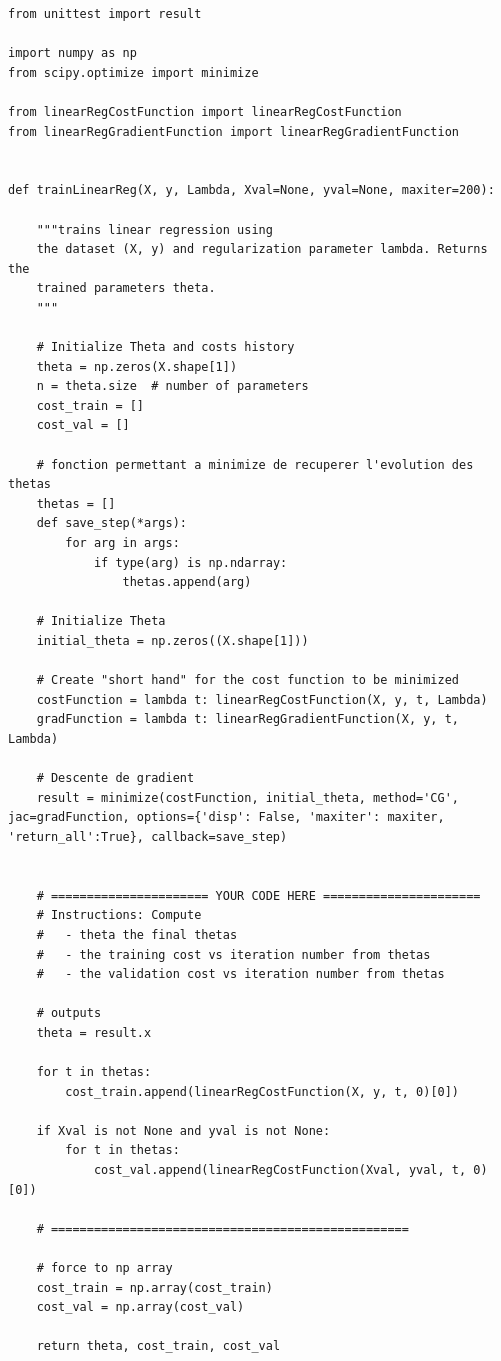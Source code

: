 \begin{lstlisting}
from unittest import result

import numpy as np
from scipy.optimize import minimize

from linearRegCostFunction import linearRegCostFunction
from linearRegGradientFunction import linearRegGradientFunction


def trainLinearReg(X, y, Lambda, Xval=None, yval=None, maxiter=200):

    """trains linear regression using
    the dataset (X, y) and regularization parameter lambda. Returns the
    trained parameters theta.
    """

    # Initialize Theta and costs history
    theta = np.zeros(X.shape[1])
    n = theta.size  # number of parameters
    cost_train = []
    cost_val = []

    # fonction permettant a minimize de recuperer l'evolution des thetas
    thetas = []
    def save_step(*args):
        for arg in args:
            if type(arg) is np.ndarray:
                thetas.append(arg)

    # Initialize Theta
    initial_theta = np.zeros((X.shape[1]))

    # Create "short hand" for the cost function to be minimized
    costFunction = lambda t: linearRegCostFunction(X, y, t, Lambda)
    gradFunction = lambda t: linearRegGradientFunction(X, y, t, Lambda)

    # Descente de gradient
    result = minimize(costFunction, initial_theta, method='CG', jac=gradFunction, options={'disp': False, 'maxiter': maxiter, 'return_all':True}, callback=save_step)


    # ====================== YOUR CODE HERE ======================
    # Instructions: Compute
    #   - theta the final thetas
    #   - the training cost vs iteration number from thetas
    #   - the validation cost vs iteration number from thetas

    # outputs
    theta = result.x

    for t in thetas:
        cost_train.append(linearRegCostFunction(X, y, t, 0)[0])

    if Xval is not None and yval is not None:
        for t in thetas:
            cost_val.append(linearRegCostFunction(Xval, yval, t, 0)[0])

    # ==================================================

    # force to np array
    cost_train = np.array(cost_train)
    cost_val = np.array(cost_val)

    return theta, cost_train, cost_val
\end{lstlisting}

